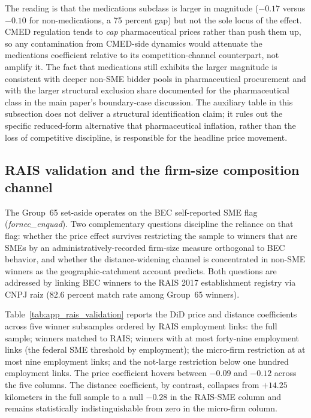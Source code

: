 \documentclass[12pt]{article}
\begin{document}
The reading is that the medications subclass is larger in magnitude
(\(-0.17\) versus \(-0.10\) for non-medications, a 75 percent gap) but not
the sole locus of the effect. CMED regulation tends to \emph{cap}
pharmaceutical prices rather than push them up, so any contamination from
CMED-side dynamics would attenuate the medications coefficient relative
to its competition-channel counterpart, not amplify it. The fact that
medications still exhibits the larger magnitude is consistent with deeper
non-SME bidder pools in pharmaceutical procurement and with the larger
structural exclusion share documented for the pharmaceutical class in the
main paper's boundary-case discussion. The auxiliary table in this
subsection does not deliver a structural identification claim; it rules
out the specific reduced-form alternative that pharmaceutical inflation,
rather than the loss of competitive discipline, is responsible for the
headline price movement.

\subsection{RAIS validation and the firm-size composition channel}\label{oa:rais_validation}

The Group~65 set-aside operates on the BEC self-reported SME flag
(\textit{fornec\_enquad}). Two complementary questions discipline the
reliance on that flag: whether the price effect survives restricting the
sample to winners that are SMEs by an administratively-recorded firm-size
measure orthogonal to BEC behavior, and whether the distance-widening
channel is concentrated in non-SME winners as the geographic-catchment
account predicts. Both questions are addressed by linking BEC winners to
the RAIS 2017 establishment registry via CNPJ raiz (82.6 percent match
rate among Group~65 winners).

Table~\ref{tab:app_rais_validation} reports the DiD price and distance
coefficients across five winner subsamples ordered by RAIS employment
links: the full sample; winners matched to RAIS; winners with at most
forty-nine employment links (the federal SME threshold by employment); the
micro-firm restriction at at most nine employment links; and the not-large
restriction below one hundred employment links. The price coefficient
hovers between \(-0.09\) and \(-0.12\) across the five columns. The
distance coefficient, by contrast, collapses from \(+14.25\) kilometers in
the full sample to a null \(-0.28\) in the RAIS-SME column and remains
statistically indistinguishable from zero in the micro-firm column.
\end{document}
